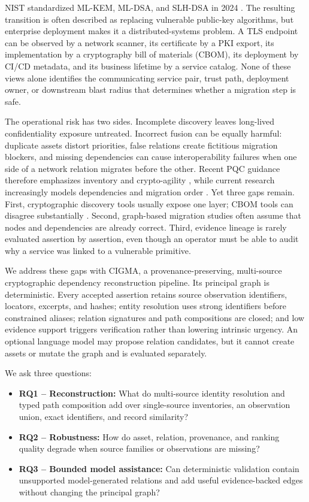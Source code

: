 \documentclass[a4paper,twoside]{article}
\newcommand{\cigma}{CIGMA\xspace}
\begin{document}
NIST standardized ML-KEM, ML-DSA, and SLH-DSA in 2024 \cite{nist2024fips203,nist2024fips204,nist2024fips205}. The resulting transition is often described as replacing vulnerable public-key algorithms, but enterprise deployment makes it a distributed-systems problem. A TLS endpoint can be observed by a network scanner, its certificate by a PKI export, its implementation by a cryptography bill of materials (CBOM), its deployment by CI/CD metadata, and its business lifetime by a service catalog. None of these views alone identifies the communicating service pair, trust path, deployment owner, or downstream blast radius that determines whether a migration step is safe.

The operational risk has two sides. Incomplete discovery leaves long-lived confidentiality exposure untreated. Incorrect fusion can be equally harmful: duplicate assets distort priorities, false relations create fictitious migration blockers, and missing dependencies can cause interoperability failures when one side of a network relation migrates before the other. Recent PQC guidance therefore emphasizes inventory and crypto-agility \cite{moody2024transition,cisa2024strategy}, while current research increasingly models dependencies and migration order \cite{hasan2024framework,sharma2026dependency,herzinger2026twin}. Yet three gaps remain. First, cryptographic discovery tools usually expose one layer; CBOM tools can disagree substantially \cite{bogli2026bfcbom}. Second, graph-based migration studies often assume that nodes and dependencies are already correct. Third, evidence lineage is rarely evaluated assertion by assertion, even though an operator must be able to audit why a service was linked to a vulnerable primitive.

We address these gaps with \cigma, a provenance-preserving, multi-source cryptographic dependency reconstruction pipeline. Its principal graph is deterministic. Every accepted assertion retains source observation identifiers, locators, excerpts, and hashes; entity resolution uses strong identifiers before constrained aliases; relation signatures and path compositions are closed; and low evidence support triggers verification rather than lowering intrinsic urgency. An optional language model may propose relation candidates, but it cannot create assets or mutate the graph and is evaluated separately.

We ask three questions:
\begin{itemize}
\item \textbf{RQ1 -- Reconstruction:} What do multi-source identity resolution and typed path composition add over single-source inventories, an observation union, exact identifiers, and record similarity?
\item \textbf{RQ2 -- Robustness:} How do asset, relation, provenance, and ranking quality degrade when source families or observations are missing?
\item \textbf{RQ3 -- Bounded model assistance:} Can deterministic validation contain unsupported model-generated relations and add useful evidence-backed edges without changing the principal graph?
\end{itemize}
\end{document}
